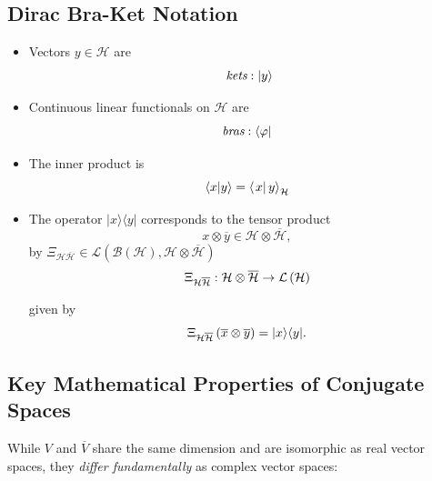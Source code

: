 \documentclass[aps,preprint]{revtex4}
\begin{document}
\subsection{Dirac Bra-Ket Notation}

\begin{itemize}
\item Vectors $y\in \mathcal{H}$ are%
\begin{equation}
\emph{\ kets}:|y\rangle
\end{equation}

\item Continuous linear functionals on $\mathcal{H}$ are 
\begin{equation}
\emph{bras}:\langle \varphi |
\end{equation}

\item The inner product is 
\begin{equation}
\langle x|y\rangle =\left\langle \left. x\right\vert y\right\rangle _{%
\mathcal{H}}
\end{equation}

\item The operator $|x\rangle \langle y|$ corresponds to the tensor product 
\begin{equation}
x\otimes \overline{y}\in \mathcal{H}\otimes \overline{\mathcal{H}},
\end{equation}%
by $\Xi _{\mathcal{H}\overline{\mathcal{H}}}\in \mathcal{L}\left( \mathcal{B}%
\left( \mathcal{H}\right) ,\mathcal{H}\otimes \overline{\mathcal{H}}\right) $
\begin{equation}
\Xi _{\mathcal{H}\overline{\mathcal{H}}}:\mathcal{H\otimes \overline{%
\mathcal{H}}\rightarrow L}\left( \mathcal{H}\right)
\end{equation}

given by 
\begin{equation}
\Xi _{\mathcal{H}\overline{\mathcal{H}}}\left( \overline{x}\otimes \overline{%
y}\right) =|x\rangle \langle y|.
\end{equation}
\end{itemize}

\subsection{Key Mathematical Properties of Conjugate Spaces}

While $V$ and $\overline{V}$ share the same dimension and are isomorphic as
real vector spaces, they \emph{differ fundamentally} as complex vector
spaces:
\end{document}
